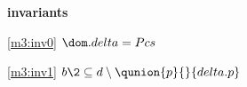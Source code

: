 \textbf{invariants}
\begin{block}
\item[ \eqref{m3:inv0} ]{$\dom.delta = Pcs $} %
\item[ \eqref{m3:inv1} ]{$b \2\subseteq d \setminus  %
		\qunion{p}{}{delta.p} $} %
\end{block}

